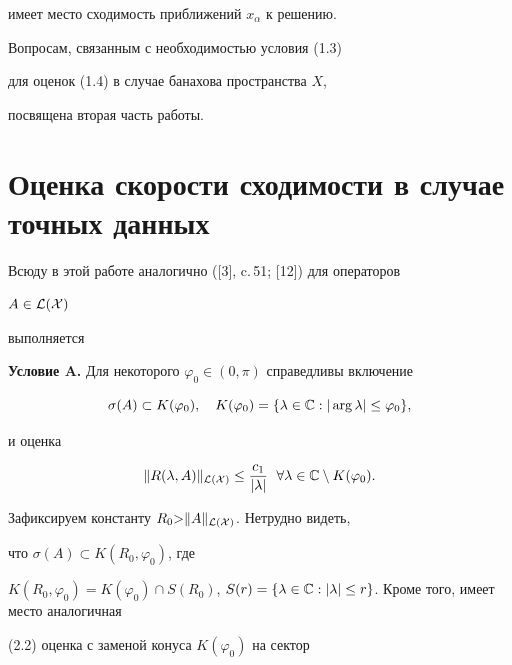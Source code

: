 имеет место сходимость приближений $x_\alpha$ к решению. 


Вопросам, связанным с необходимостью условия (1.3) 


для оценок (1.4) в случае банахова пространства $X$,


посвящена вторая часть работы. 


 


\section{Оценка скорости сходимости в случае точных данных} 


 


Всюду в этой работе аналогично ([3], c.\,51; [12]) для операторов 


$A\in\cal L(X)$ 


выполняется 


\medskip 


 


{\bf Условие A.} Для некоторого $\varphi_0\in(0,\pi)$ справедливы включение 


\begin{equation} 


\sigma(A)\subset K(\varphi_0),\quad 


K(\varphi_0)=\{\lambda\in\Bbb C:|\arg\lambda|\le\varphi_0\}, 


\end{equation} 


и оценка 


\begin{equation} 


\|R(\lambda,A)\|_{\cal L(X)}\le\frac{c_1}{|\lambda|} 


\ \; \forall\lambda\in\Bbb C\setminus K(\varphi_0). 


\end{equation} 


 


Зафиксируем константу $R_0{>}\|A\|_{\cal L(X)}$. Нетрудно видеть, 


что $\sigma(A){\subset} K(R_0,\varphi_0)$, где 


$K(R_0,\varphi_0)=K(\varphi_0)\cap S(R_0)$, $S(r)=\{\lambda\in \Bbb 


C:|\lambda|\le r\}$. Кроме того, имеет место аналогичная 


(2.2) оценка с заменой конуса $K(\varphi_0)$ на сектор 


